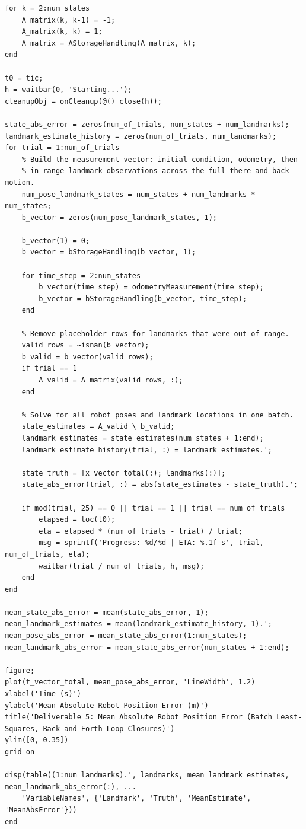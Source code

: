 \documentclass[11pt]{article}
\begin{document}
\begin{lstlisting}[caption={sim5.m}, label={lst:sim5}]
for k = 2:num_states
    A_matrix(k, k-1) = -1;
    A_matrix(k, k) = 1;
    A_matrix = AStorageHandling(A_matrix, k);
end

t0 = tic;
h = waitbar(0, 'Starting...');
cleanupObj = onCleanup(@() close(h));

state_abs_error = zeros(num_of_trials, num_states + num_landmarks);
landmark_estimate_history = zeros(num_of_trials, num_landmarks);
for trial = 1:num_of_trials
    % Build the measurement vector: initial condition, odometry, then
    % in-range landmark observations across the full there-and-back motion.
    num_pose_landmark_states = num_states + num_landmarks * num_states;
    b_vector = zeros(num_pose_landmark_states, 1);

    b_vector(1) = 0;
    b_vector = bStorageHandling(b_vector, 1);

    for time_step = 2:num_states
        b_vector(time_step) = odometryMeasurement(time_step);
        b_vector = bStorageHandling(b_vector, time_step);
    end

    % Remove placeholder rows for landmarks that were out of range.
    valid_rows = ~isnan(b_vector);
    b_valid = b_vector(valid_rows);
    if trial == 1
        A_valid = A_matrix(valid_rows, :);
    end

    % Solve for all robot poses and landmark locations in one batch.
    state_estimates = A_valid \ b_valid;
    landmark_estimates = state_estimates(num_states + 1:end);
    landmark_estimate_history(trial, :) = landmark_estimates.';

    state_truth = [x_vector_total(:); landmarks(:)];
    state_abs_error(trial, :) = abs(state_estimates - state_truth).';

    if mod(trial, 25) == 0 || trial == 1 || trial == num_of_trials
        elapsed = toc(t0);
        eta = elapsed * (num_of_trials - trial) / trial;
        msg = sprintf('Progress: %d/%d | ETA: %.1f s', trial, num_of_trials, eta);
        waitbar(trial / num_of_trials, h, msg);
    end
end

mean_state_abs_error = mean(state_abs_error, 1);
mean_landmark_estimates = mean(landmark_estimate_history, 1).';
mean_pose_abs_error = mean_state_abs_error(1:num_states);
mean_landmark_abs_error = mean_state_abs_error(num_states + 1:end);

figure;
plot(t_vector_total, mean_pose_abs_error, 'LineWidth', 1.2)
xlabel('Time (s)')
ylabel('Mean Absolute Robot Position Error (m)')
title('Deliverable 5: Mean Absolute Robot Position Error (Batch Least-Squares, Back-and-Forth Loop Closures)')
ylim([0, 0.35])
grid on

disp(table((1:num_landmarks).', landmarks, mean_landmark_estimates, mean_landmark_abs_error(:), ...
    'VariableNames', {'Landmark', 'Truth', 'MeanEstimate', 'MeanAbsError'}))
end
\end{lstlisting}
\end{document}
